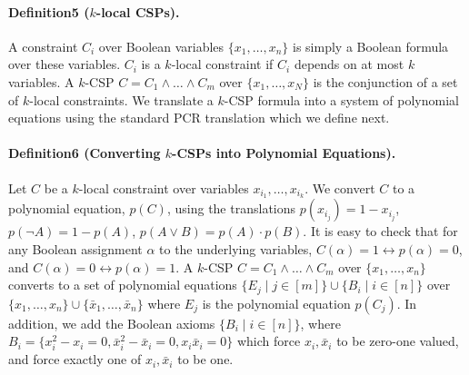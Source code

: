 \paragraph{Definition5 ($k$-local CSPs).}
A constraint $C_i$ over Boolean variables $\{x_1,\ldots,x_n\}$ is simply a Boolean formula over these variables. $C_i$ is a $k$-local constraint if $C_i$ depends on at most $k$ variables. A $k$-CSP $C=C_1\land\ldots\land C_m$ over $\{x_1,\ldots,x_N\}$ is the conjunction of a set of $k$-local constraints.
We translate a $k$-CSP formula into a system of polynomial equations using the standard PCR translation which we define next.
\paragraph{Definition6 (Converting $k$-CSPs into Polynomial Equations).}
Let $C$ be a $k$-local constraint over variables $x_{i_1},\ldots,x_{i_k}$. We convert $C$ to a polynomial equation, $p(C)$, using the translations $p(x_{i_j})=1-x_{i_j}$, $p(\neg A)=1-p(A)$, $p(A\lor B)=p(A)\cdot p(B)$. It is easy to check that for any Boolean assignment $\alpha$ to the underlying variables, $C(\alpha)=1\leftrightarrow p(\alpha)=0$, and $C(\alpha)=0\leftrightarrow p(\alpha)=1$.
A $k$-CSP $C=C_1\land\ldots\land C_m$ over $\{x_1,\ldots,x_n\}$ converts to a set of polynomial equations $\{E_j\mid j\in[m]\}\cup\{B_i\mid i\in[n]\}$ over $\{x_1,\ldots,x_n\}\cup\{\bar x_1,\ldots,\bar x_n\}$ where $E_j$ is the polynomial equation $p(C_j)$. In addition, we add the Boolean axioms $\{B_i\mid i\in[n]\}$, where $B_i=\{x_i^2-x_i=0,\bar x_i^2-\bar x_i=0,x_i\bar x_i=0\}$ which force $x_i,\bar x_i$ to be zero-one valued, and force exactly one of $x_i,\bar x_i$ to be one.
